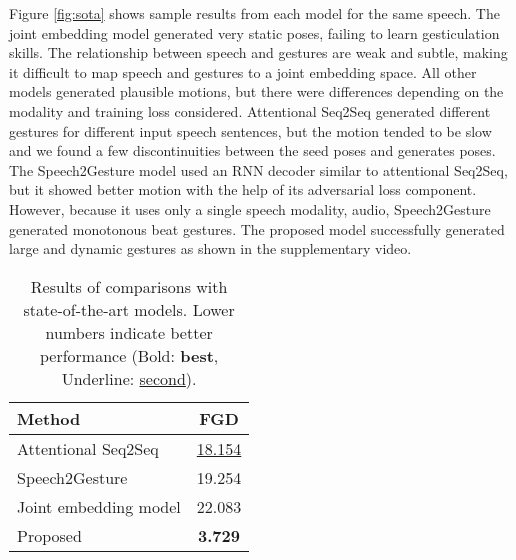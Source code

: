 \documentclass[acmtog]{acmart}
\begin{document}
Figure \ref{fig:sota} shows sample results from each model for the same speech. The joint embedding model generated very static poses, failing to learn gesticulation skills. The relationship between speech and gestures are weak and subtle, making it difficult to map speech and gestures to a joint embedding space. All other models generated plausible motions, but there were differences depending on the modality and training loss considered. Attentional Seq2Seq generated different gestures for different input speech sentences, but the motion tended to be slow and we found a few discontinuities between the seed poses and generates poses. The Speech2Gesture model used an RNN decoder similar to attentional Seq2Seq, but it showed better motion with the help of its adversarial loss component. However, because it uses only a single speech modality, audio, Speech2Gesture generated monotonous beat gestures. The proposed model successfully generated large and dynamic gestures as shown in the supplementary video.


\begin{table}
\caption{Results of comparisons with state-of-the-art models. Lower numbers indicate better performance (Bold: \textbf{best}, Underline: \underline{second}).}
\label{tab:compare}
\centering
\begin{tabularx}{\linewidth}{Xc}
  \toprule
  Method & FGD\\ 
  \midrule
  Attentional Seq2Seq \cite{yoon2019robots} & \underline{18.154}\\
  Speech2Gesture \cite{ginosar2019gestures} & 19.254\\
  Joint embedding model \cite{ahuja2019language2pose} & 22.083\\
  Proposed & \textbf{3.729}\\
  \bottomrule
\end{tabularx}
\end{table}
\end{document}
